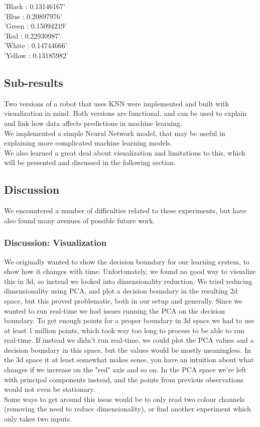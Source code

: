 \documentclass[11pt, a4paper]{article}
\begin{document}
'Black : 0.13146167' \\

'Blue : 0.20897976' \\

'Green : 0.15094219' \\

'Red : 0.22930987' \\

'White : 0.14744666' \\

'Yellow : 0.13185982' 

\subsection{Sub-results}
Two versions of a robot that uses KNN were implemented and built with visualization in mind. Both versions are functional, and can be used to explain and link how data affects predictions in machine learning.  \\
We implemented a simple Neural Network model, that may be useful in explaining more complicated machine learning models. \\
We also learned a great deal about visualization and limitations to this, which will be presented and discussed in the following section.
\subsection{Discussion}
We encountered a number of difficulties related to these experiments, but have also found many avenues of possible future work.
\subsubsection{Discussion: Visualization}
We originally wanted to show the decision boundary for our learning system, to show how it changes with time. Unfortunately, we found no good way to visualize this in 3d, so instead we looked into dimensionality reduction. We tried reducing dimensionality using PCA, and plot a decision boundary in the resulting 2d space, but this proved problematic, both in our setup and generally. Since we wanted to run real-time we had issues running the PCA on the decision boundary. To get enough points for a proper boundary in 3d space we had to use at least 1 million points, which took way too long to process to be able to run real-time. If instead we didn't run real-time, we could plot the PCA values and a decision boundary in this space, but the values would be mostly meaningless. In the 3d space it at least somewhat makes sense, you have an intuition about what changes if we increase on the "red" axis and so on. In the PCA space we're left with principal components instead, and the points from previous observations would not even be stationary. \\
Some ways to get around this issue would be to only read two colour channels (removing the need to reduce dimensionality), or find another experiment which only takes two inputs. 
\end{document}
